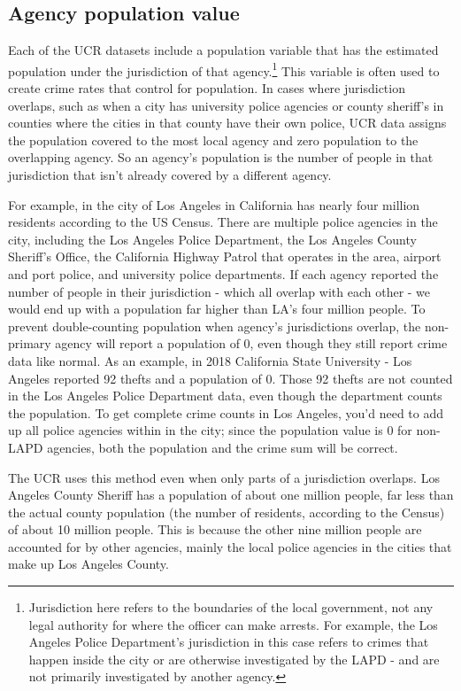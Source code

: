 \documentclass[
  12pt,
  openany]{book}
\begin{document}
\hypertarget{agency-population-value}{%
\subsection{Agency population value}\label{agency-population-value}}

Each of the UCR datasets include a population variable that has the estimated population under the jurisdiction of that agency.\footnote{Jurisdiction here refers to the boundaries of the local government, not any legal authority for where the officer can make arrests. For example, the Los Angeles Police Department's jurisdiction in this case refers to crimes that happen inside the city or are otherwise investigated by the LAPD - and are not primarily investigated by another agency.} This variable is often used to create crime rates that control for population. In cases where jurisdiction overlaps, such as when a city has university police agencies or county sheriff's in counties where the cities in that county have their own police, UCR data assigns the population covered to the most local agency and zero population to the overlapping agency. So an agency's population is the number of people in that jurisdiction that isn't already covered by a different agency.

For example, in the city of Los Angeles in California has nearly four million residents according to the US Census. There are multiple police agencies in the city, including the Los Angeles Police Department, the Los Angeles County Sheriff's Office, the California Highway Patrol that operates in the area, airport and port police, and university police departments. If each agency reported the number of people in their jurisdiction - which all overlap with each other - we would end up with a population far higher than LA's four million people. To prevent double-counting population when agency's jurisdictions overlap, the non-primary agency will report a population of 0, even though they still report crime data like normal. As an example, in 2018 California State University - Los Angeles reported 92 thefts and a population of 0. Those 92 thefts are not counted in the Los Angeles Police Department data, even though the department counts the population. To get complete crime counts in Los Angeles, you'd need to add up all police agencies within in the city; since the population value is 0 for non-LAPD agencies, both the population and the crime sum will be correct.

The UCR uses this method even when only parts of a jurisdiction overlaps. Los Angeles County Sheriff has a population of about one million people, far less than the actual county population (the number of residents, according to the Census) of about 10 million people. This is because the other nine million people are accounted for by other agencies, mainly the local police agencies in the cities that make up Los Angeles County.
\end{document}

